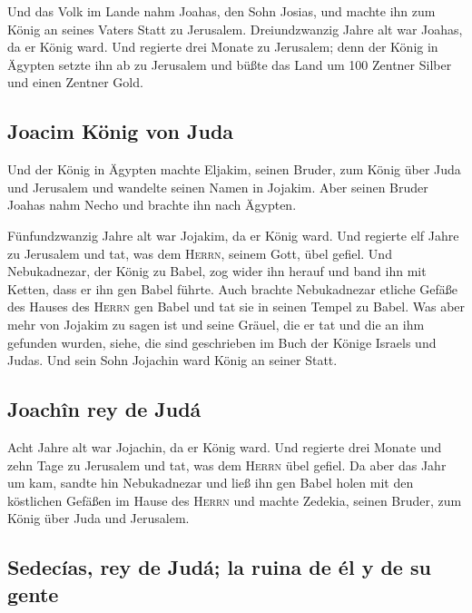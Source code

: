  Und das Volk im Lande nahm Joahas, den Sohn Josias, und
machte ihn zum König an seines Vaters Statt zu Jerusalem. 
Dreiundzwanzig Jahre alt war Joahas, da er König ward. Und regierte drei
Monate zu Jerusalem;  denn der König in Ägypten setzte ihn
ab zu Jerusalem und büßte das Land um 100 Zentner Silber und einen
Zentner Gold.

\hypertarget{joacim-kuxf6nig-von-juda}{%
\subsection{Joacim König von Juda}\label{joacim-kuxf6nig-von-juda}}

 Und der König in Ägypten machte Eljakim, seinen Bruder,
zum König über Juda und Jerusalem und wandelte seinen Namen in Jojakim.
Aber seinen Bruder Joahas nahm Necho und brachte ihn nach Ägypten.

 Fünfundzwanzig Jahre alt war Jojakim, da er König ward.
Und regierte elf Jahre zu Jerusalem und tat, was dem \textsc{Herrn},
seinem Gott, übel gefiel.  Und Nebukadnezar, der König zu
Babel, zog wider ihn herauf und band ihn mit Ketten, dass er ihn gen
Babel führte.  Auch brachte Nebukadnezar etliche Gefäße
des Hauses des \textsc{Herrn} gen Babel und tat sie in seinen Tempel zu
Babel.  Was aber mehr von Jojakim zu sagen ist und seine
Gräuel, die er tat und die an ihm gefunden wurden, siehe, die sind
geschrieben im Buch der Könige Israels und Judas. Und sein Sohn Jojachin
ward König an seiner Statt.

\hypertarget{joachuxeen-rey-de-juduxe1}{%
\subsection{Joachîn rey de Judá}\label{joachuxeen-rey-de-juduxe1}}

 Acht Jahre alt war Jojachin, da er König ward. Und
regierte drei Monate und zehn Tage zu Jerusalem und tat, was dem
\textsc{Herrn} übel gefiel.  Da aber das Jahr um kam,
sandte hin Nebukadnezar und ließ ihn gen Babel holen mit den köstlichen
Gefäßen im Hause des \textsc{Herrn} und machte Zedekia, seinen Bruder,
zum König über Juda und Jerusalem.

\hypertarget{sedecuxedas-rey-de-juduxe1-la-ruina-de-uxe9l-y-de-su-gente}{%
\subsection{Sedecías, rey de Judá; la ruina de él y de su
gente}\label{sedecuxedas-rey-de-juduxe1-la-ruina-de-uxe9l-y-de-su-gente}}

